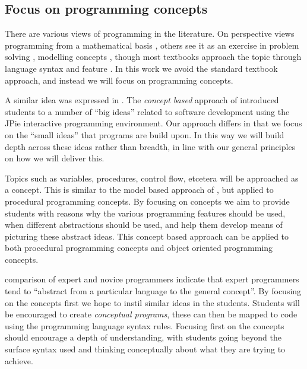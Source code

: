 
\subsection{Focus on programming concepts} %
\label{sub:focus_on_programming_concepts}

There are various views of programming in the literature. On perspective views programming from a mathematical basis \cite{Denning:1989,Dijkstra:1989,Hoare:1969}, others see it as an exercise in problem solving \cite{Palumbo:1990}, modelling concepts \cite{Bennedsen:2004}, though most textbooks approach the topic through language syntax and feature \cite{Robins:2003}. In this work we avoid the standard textbook approach, and instead we will focus on programming concepts.

A similar idea was expressed in \citet{Goldman:2004}. The \emph{concept based} approach of \citet{Goldman:2004} introduced students to a number of ``big ideas'' related to software development using the JPie interactive programming environment. Our approach differs in that we focus on the ``small ideas'' that programs are build upon. In this way we will build depth across these ideas rather than breadth, in line with our general principles on how we will deliver this.

Topics such as variables, procedures, control flow, etcetera will be approached as a concept. This is similar to the model based approach of \citet{Bennedsen:2004}, but applied to procedural programming concepts. By focusing on concepts we aim to provide students with reasons why the various programming features should be used, when different abstractions should be used, and help them develop means of picturing these abstract ideas. This concept based approach can be applied to both procedural programming concepts and object oriented programming concepts.

\citet{Winslow:1996} comparison of expert and novice programmers indicate that expert programmers tend to ``abstract from a particular language to the general concept''. By focusing on the concepts first we hope to instil similar ideas in the students. Students will be encouraged to create \emph{conceptual programs}, these can then be mapped to code using the programming language syntax rules. Focusing first on the concepts should encourage a depth of understanding, with students going beyond the surface syntax used and thinking conceptually about what they are trying to achieve.

